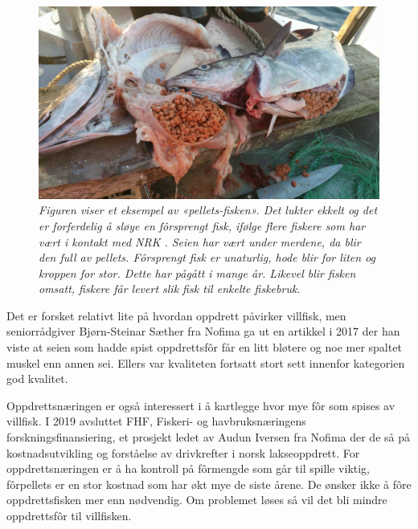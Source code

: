 \begin{figure} 
\begin{center} 
\includegraphics[scale=0.2]{figures/oppdrettfor}
\caption{\small \sl Figuren viser et eksempel av «pellets-fisken». Det lukter ekkelt og det er forferdelig å sløye en fôrsprengt fisk, ifølge flere fiskere som har vært i kontakt med NRK \cite{Trana m.fl. 2019}. Seien har vært under merdene, da blir den full av pellets. Fôrsprengt fisk er unaturlig, hode blir for liten og kroppen for stor. Dette har pågått i mange år. Likevel blir fisken omsatt, fiskere får levert slik fisk til enkelte fiskebruk. \cite{Angell og Ekanger 2017} \label{fig:oppdrettfor}} 
\end{center} 
\end{figure} 

Det er forsket relativt lite på hvordan oppdrett påvirker villfisk, men seniorrådgiver Bjørn-Steinar Sæther fra Nofima ga ut en artikkel i 2017 der han viste at seien som hadde spist oppdrettsfôr får en litt bløtere og noe mer spaltet muskel enn annen sei. Ellers var kvaliteten fortsatt stort sett innenfor kategorien god kvalitet. \cite{Saether 2017}


Oppdrettsnæringen er også interessert i å kartlegge hvor mye fôr som spises av villfisk. I 2019 avsluttet FHF, Fiskeri- og havbruksnæringens forskningsfinansiering, et prosjekt ledet av Audun Iversen fra Nofima der de så på kostnadsutvikling og forståelse av drivkrefter i norsk lakseoppdrett. For oppdrettsnæringen er å ha kontroll på fôrmengde som går til spille viktig, fôrpellets er en stor kostnad som har økt mye de siste årene. De ønsker ikke å fôre oppdrettsfisken mer enn nødvendig. Om problemet løses så vil det bli mindre oppdrettsfôr til villfisken. \cite{Baevre-Jensen 2019}

